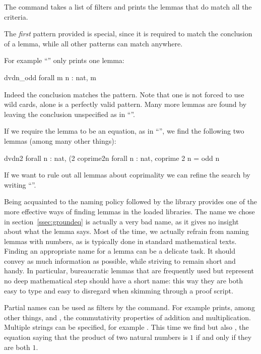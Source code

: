 
The  command takes a list of filters and prints the lemmas
that do match all the criteria.

The \emph{first} pattern provided is special, since it is required to match
the conclusion of a lemma, while all other patterns can match anywhere.

For example ``'' only prints one lemma:

\begin{coq}{}{}
dvdn_odd  forall m n : nat, m %
\end{coq}
Indeed the conclusion matches the pattern.  Note that one is not forced to
use wild cards,  alone is a perfectly valid pattern.  Many more
lemmas are found by leaving the conclusion unspecified as in ``''.

If we require the lemma to be an equation, as in ``'', we find
the following two lemmas (among many other things):

\begin{coqout}{}{}
dvdn2  forall n : nat, (2 %
coprime2n  forall n : nat, coprime 2 n = odd n
\end{coqout}
If we want to rule out all lemmas about coprimality we can refine the
search by writing ``''.


Being acquainted to the naming policy followed by the \mcbMC{} library
provides one of the more effective ways of finding lemmas in the
loaded libraries. The name   we chose in
section~\ref{ssec:groundeq} is actually a very bad name, as it gives no
insight about what the lemma says. Most of the time, we actually
refrain  from naming lemmas with numbers, as is typically done in
standard mathematical texts. Finding an appropriate name for a
lemma can be a delicate task. It should convey as much information as
possible, while striving to remain short and handy. In particular,
bureaucratic lemmas that are frequently used but represent no deep
mathematical step should have a short name: this way they are both
easy to type and easy to disregard when skimming through a proof
script.

Partial names can be used as filters by the  command. For example
 prints, among other things,  and ,
the commutativity properties of addition and multiplication.  Multiple
strings can be specified, for example .  This time
we find  but also , the equation saying that
the product of two natural numbers is $1$ if and only if they are both $1$.

